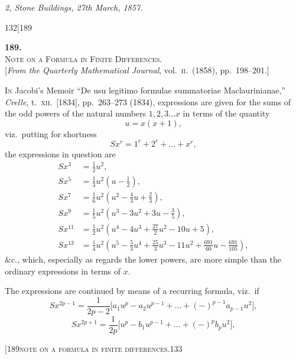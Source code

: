 \documentclass[11pt]{article}
\begin{document}
\medskip
\textit{2, Stone Buildings, 27th March, 1857.}

\bigskip
\begin{center}\small\textsc{132}\hfill[189\end{center}

\begin{center}
\textbf{189.}\\[0.5em]
\textsc{Note on a Formula in Finite Differences.}\\[0.4em]
\small [\textit{From the Quarterly Mathematical Journal}, vol.\ \textsc{ii}.\ (1858), pp.\ 198--201.]
\end{center}

\medskip
\noindent \textsc{In} Jacobi's Memoir ``De usu legitimo formulae summatoriae Maclaurinianae,'' \textit{Crelle},
t.\ \textsc{xii}.\ [1834], pp.\ 263--273 (1834), expressions are given for the sums of the odd
powers of the natural numbers $1, 2, 3\ldots x$ in terms of the quantity
\[
u = x(x+1),
\]
viz.\ putting for shortness
\[
S x^{r} = 1^{r} + 2^{r} + \ldots + x^{r},
\]
the expressions in question are
\[
\begin{aligned}
S x^{3} &= \tfrac{1}{2} u^{2},\\
S x^{5} &= \tfrac{1}{3} u^{2}(u - \tfrac{1}{2}),\\
S x^{7} &= \tfrac{1}{6} u^{2}(u^{2} - \tfrac{4}{3}u + \tfrac{2}{3}),\\
S x^{9} &= \tfrac{1}{5} u^{2}(u^{3} - 3u^{2} + 3u - \tfrac{3}{5}),\\
S x^{11} &= \tfrac{1}{2} u^{2}(u^{4} - 4u^{3} + \tfrac{27}{2}u^{2} - 10u + 5),\\
S x^{13} &= \tfrac{1}{4} u^{2}(u^{5} - \tfrac{5}{3}u^{4} + \tfrac{25}{3}u^{3} - 11u^{2} + \tfrac{691}{60}u - \tfrac{691}{105}),
\end{aligned}
\]
\&c.,
which, especially as regards the lower powers, are more simple than the ordinary
expressions in terms of $x$.

The expressions are continued by means of a recurring formula, viz.\ if
\[
S x^{2p-1} = \frac{1}{2p-2}\bigl[a_{1}u^{p} - a_{2}u^{p-1} + \ldots + (-)^{p-1} a_{p-1}u^{2}\bigr],
\]
\[
S x^{2p+1} = \frac{1}{2p}\bigl[u^{p} - b_{1}u^{p-1} + \ldots + (-)^{p} b_{p}u^{2}\bigr],
\]

\begin{center}\small[189\hfill\textsc{note on a formula in finite differences.}\hfill\textsc{133}\end{center}
\end{document}
